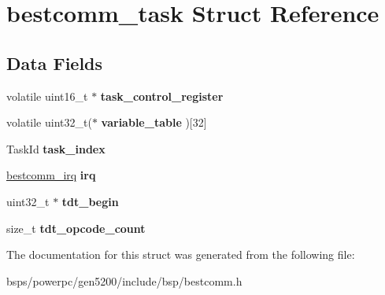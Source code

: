 \hypertarget{structbestcomm__task}{}\section{bestcomm\+\_\+task Struct Reference}
\label{structbestcomm__task}
\subsection*{Data Fields}
\begin{DoxyCompactItemize}
\item 
\mbox{\label{structbestcomm__task_a4c281a5907b1ce5519795e10521f1ebb}} 
volatile uint16\+\_\+t $\ast$ {\bfseries task\+\_\+control\+\_\+register}
\item 
\mbox{\label{structbestcomm__task_ad7da4db4c47448d19d1526786e7708d2}} 
volatile uint32\+\_\+t($\ast$ {\bfseries variable\+\_\+table} )\mbox{[}32\mbox{]}
\item 
\mbox{\label{structbestcomm__task_afaa8772515ea45b90a9b1b06c9b82744}} 
Task\+Id {\bfseries task\+\_\+index}
\item 
\mbox{\label{structbestcomm__task_a2ee261c22995a5b85fb0772ba39140b8}} 
\mbox{\hyperlink{structbestcomm__irq}{bestcomm\+\_\+irq}} {\bfseries irq}
\item 
\mbox{\label{structbestcomm__task_af844dd4557b1da5077ea73adf8a7af79}} 
uint32\+\_\+t $\ast$ {\bfseries tdt\+\_\+begin}
\item 
\mbox{\label{structbestcomm__task_a39e82f440115d608a42a817feedc6443}} 
size\+\_\+t {\bfseries tdt\+\_\+opcode\+\_\+count}
\end{DoxyCompactItemize}


The documentation for this struct was generated from the following file\+:\begin{DoxyCompactItemize}
\item 
bsps/powerpc/gen5200/include/bsp/bestcomm.\+h\end{DoxyCompactItemize}
